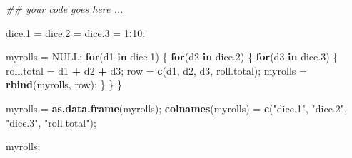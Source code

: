 \documentclass[
]{article}
\newenvironment{Shaded}{\begin{snugshade}}{\end{snugshade}}
\newcommand{\CommentTok}[1]{\textcolor[rgb]{0.56,0.35,0.01}{\textit{#1}}}
\newcommand{\ControlFlowTok}[1]{\textcolor[rgb]{0.13,0.29,0.53}{\textbf{#1}}}
\newcommand{\DecValTok}[1]{\textcolor[rgb]{0.00,0.00,0.81}{#1}}
\newcommand{\FloatTok}[1]{\textcolor[rgb]{0.00,0.00,0.81}{#1}}
\newcommand{\KeywordTok}[1]{\textcolor[rgb]{0.13,0.29,0.53}{\textbf{#1}}}
\newcommand{\NormalTok}[1]{#1}
\newcommand{\OperatorTok}[1]{\textcolor[rgb]{0.81,0.36,0.00}{\textbf{#1}}}
\newcommand{\OtherTok}[1]{\textcolor[rgb]{0.56,0.35,0.01}{#1}}
\newcommand{\StringTok}[1]{\textcolor[rgb]{0.31,0.60,0.02}{#1}}
\begin{document}
\begin{Shaded}
\begin{Highlighting}[]
\CommentTok{\#\# your code goes here ...}

\NormalTok{dice}\FloatTok{.1}\NormalTok{ =}\StringTok{ }\NormalTok{dice}\FloatTok{.2}\NormalTok{ =}\StringTok{ }\NormalTok{dice}\FloatTok{.3}\NormalTok{ =}\StringTok{ }\DecValTok{1}\OperatorTok{:}\DecValTok{10}\NormalTok{;}

\NormalTok{myrolls =}\StringTok{ }\OtherTok{NULL}\NormalTok{;}
\ControlFlowTok{for}\NormalTok{(d1 }\ControlFlowTok{in}\NormalTok{ dice}\FloatTok{.1}\NormalTok{)}
\NormalTok{  \{}
  \ControlFlowTok{for}\NormalTok{(d2 }\ControlFlowTok{in}\NormalTok{ dice}\FloatTok{.2}\NormalTok{)}
\NormalTok{    \{}
    \ControlFlowTok{for}\NormalTok{(d3 }\ControlFlowTok{in}\NormalTok{ dice}\FloatTok{.3}\NormalTok{)}
\NormalTok{      \{}
\NormalTok{      roll.total =}\StringTok{ }\NormalTok{d1 }\OperatorTok{+}\StringTok{ }\NormalTok{d2 }\OperatorTok{+}\StringTok{ }\NormalTok{d3;}
\NormalTok{      row =}\StringTok{ }\KeywordTok{c}\NormalTok{(d1, d2, d3, roll.total);}
\NormalTok{      myrolls =}\StringTok{ }\KeywordTok{rbind}\NormalTok{(myrolls, row);}
\NormalTok{      \}}
\NormalTok{    \}}
\NormalTok{  \}}

\NormalTok{myrolls =}\StringTok{ }\KeywordTok{as.data.frame}\NormalTok{(myrolls);}
\KeywordTok{colnames}\NormalTok{(myrolls) =}\StringTok{ }\KeywordTok{c}\NormalTok{(}\StringTok{"dice.1"}\NormalTok{, }\StringTok{"dice.2"}\NormalTok{, }\StringTok{"dice.3"}\NormalTok{, }\StringTok{"roll.total"}\NormalTok{);}

\NormalTok{myrolls;}
\end{Highlighting}
\end{Shaded}
\end{document}
